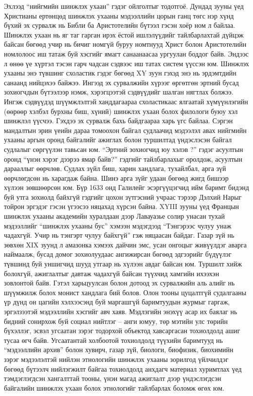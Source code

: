 Эхлээд “нийгмийн шинжлэх ухаан” гэдэг ойлголтыг тодотгоё. Дундад зууны үед Христианы ертөнцөд шинжлэх ухааны мэдээллийн цорын ганц төгс нэр хүнд бүхий эх сурвалж нь Библи ба Аристотелийн бүтээл гэсэн хоёр ном л байлаа. Шинжлэх ухаан нь яг таг гарган ирэх ёстой ишлэлүүдийг тайлбарлахтай дүйцэж байсан бөгөөд учир нь бичиг номгүй буруу номтнууд Христ болон Аристотелийн номлолоос иш татаж буй хэсгийг ямагт санаанаасаа ургуулан боддог байв. Эндээс л өнөө үе хүртэл тэсэн гарч чадсан сэдвээс иш татах систем үүссэн юм. Шинжлэх ухааны энэ түвшинг схоластик гэдэг бөгөөд XY зуун гэхэд энэ нь эрдэмтдийн санаанд нийцэхээ байжээ. Ингээд эх сурвалжийн хүрээг өргөтгөн эртний бусад зохиогчдын бүтээлээр нэмж, хэрэгцээтэй сэдвүүдийг шалган нягтлах болжээ. Ингэж сэдвүүдэд шүүмжлэлтэй ханддагаараа схоластикаас ялгаатай хүмүүнлэгийн (өөрөөр хэлбэл бурхны биш, хүний) шинжлэх ухаан болох филологи буюу хэл шинжлэл үүсчээ. Гэхдээ эх сурвалж бахь байдгаараа харь үгс байлаа. Сэргэн мандалтын эрин үеийн дараа томоохон байгал судлаачид мэдээлэл авах нийгмийн ухааны аргын оронд байгалийг ажиглах болон туршилтад үндэслэсэн байгал судлалыг сөргүүлэн тавьсан юм. “Эртний зохиогчид юу хэлэв ?” гэдэг асуултын оронд “үнэн хэрэг дээрээ ямар байв?” гэдгийг тайлбарлахыг оролдож, асуултын дарааллыг өөрчлөв. Судлах зүйл биш, харин хандлага, тухайлбал, арга зүй өөрчлөгдсөн нь харагдаж байна.
Шинэ арга зүйг удаан бөгөөд жигд бишээр хүлээн зөвшөөрсөн юм. Бүр 1633 онд Галилейг эсэргүүцэгчид ийм баримт бидэнд буй утга зохиолд байхгүй гэдгийг цохон зүтгэсний учраас тэрээр Дэлхий Нарыг тойрон эргэдэг гэсэн үгээсээ няцахад хүрсэн байна. XYIII зууны үед Францын шинжлэх ухааны академийн хуралдаан дээр Лавауазье солир унасан тухай мэдээллийг “шинжлэх ухааны бус” хэмээн мэдэгдээд “Тэнгэрээс чулуу унаж чадахгүй. Учир нь тэнгэрт чулуу байхгүй” гэж няцаасан байдаг.
Газар зүй нь зөвхөн XIX зуунд л амазонка хэмээх дайчин эмс, усан онгоцыг живүүлдэг аварга наймаалж, бусад домог зохиолуудаас ангижирсан бөгөөд эдгээрийг бүдүүлэг түвшинд буй уншигчид шууд утгаар нь хүлээн авдаг байсан юм. Туршилт хийж болохгүй, ажиглалтыг давтаж чадахгүй байсан түүхчид хамгийн ихээхэн зовлонтой байв. Гэтэл харьцуулсан болон дотоод эх сурвалжийн аль алийг нь шүүмжилж болох монист хандлага бий болов. Олон тооны цуцалтгүй судалгааны үр дүнд он цагийн хэлхээсэнд буй маргашгүй баримтуудын журмыг гаргаж, эргэлзээтэй мэдээллийн хэсгийг авч хаяв. Мэдлэгийн энэхүү асар их баялаг нь бидний сонирхож буй социал нийтлэг – анги юмуу, төр мэтийн улс төрийн бүхэллэг, эсвэл угсаатан зэрэг тодорхой объектод хавсаргасан тохиолдолд ашиг тусаа өгч байв. Угсаатантай холбоотой тохиолдолд түүхийн баримтууд нь “мэдээллийн архив” болон хувирч, газар зүй, биологи, биофизик, биохимийн зэрэг мэдээлэлтэй нийлэн этнологийн шинжлэх ухааны зорилгод үйлчилдэг бөгөөд бүтээлч нийлэгжилт байгаа тохиолдолд анхдагч материал хуримтлах үед тэмдэглэгдсэн хангалттай тооны, үнэн магад ажиглалт дээр үндэслэгдсэн байгалийн шинжлэх ухаан болох этнологийг тайлбарлах боломж өгөх юм.
